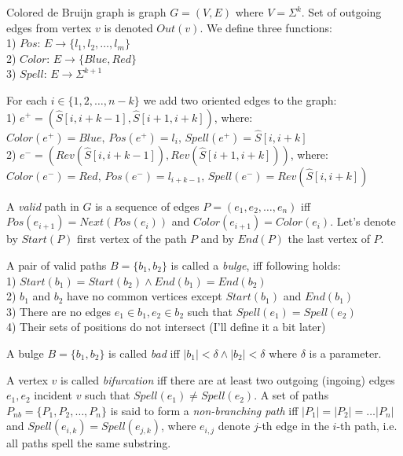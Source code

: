 \documentclass[a4paper,12pt]{scrartcl}
\begin{document}
Colored de Bruijn graph is graph \(G = (V, E) \) where \(V = \Sigma ^ k \). Set of outgoing edges from vertex \(v\) is denoted \(Out(v)\). We define three functions: \\
1) \(Pos : \, E \rightarrow \lbrace l_1, l_2, \ldots , l_m \rbrace \) \\
2) \(Color : \, E \rightarrow \lbrace Blue, Red \rbrace \) \\
3) \(Spell: \, E \rightarrow \Sigma ^ {k + 1} \)

For each \(i \in \lbrace{1, 2, \ldots, n - k} \rbrace \) we add two oriented edges to the graph: \\
1) \(e^+ = (\hat{S}[i, i + k - 1], \hat{S}[i + 1, i + k]) \), where: \\
\(Color(e^+) = Blue, \,  Pos(e^+) = l_i, \, Spell(e^+) = \hat{S}[i, i + k] \) \\
2) \(e^- = (Rev(\hat{S}[i, i + k - 1]), Rev(\hat{S}[i + 1, i + k]))\), where: \\
 \(Color(e^-) = Red, \, Pos(e^-) = l_{i + k - 1}, \, Spell(e^-) = Rev(\hat{S}[i, i + k])\)

A \textit{valid} path in \(G\) is a sequence of edges \(P = (e_{1}, e_{2}, \ldots, e_{n})\) iff \(Pos(e_{i+1})  = Next(Pos(e_{i}))\) and
\(Color(e_{i + 1}) = Color(e_{i})\). Let's denote by \(Start(P)\) first vertex of the path \(P\) and by \(End(P)\) the last vertex of \(P\).

\newpage

A pair of valid paths \(B =\lbrace b_{1}, b_{2} \rbrace \)
is called a \textit{bulge}, iff following holds: \\
1) \(Start(b_{1}) = Start(b_{2}) \wedge End(b_{1}) = End(b_{2}) \) \\
2) \(b_{1}\) and \(b_{2}\) have no common vertices except \(Start(b_{1})\) and \(End(b_{1})\) \\
3) There are no edges \(e_{1} \in b_{1}, e_{2} \in b_{2} \) such that \(Spell(e_{1}) = Spell(e_{2})\) \\
4) Their sets of positions do not intersect (I'll define it a bit later) 

A bulge \(B =\lbrace b_{1}, b_{2} \rbrace \) is called \textit{bad} iff \(|b_1| < \delta \wedge |b_2| < \delta\) where \(\delta\) is a parameter.

A vertex \(v\) is called \textit{bifurcation} iff there are at least two outgoing (ingoing) edges \(e_{1}, e_{2}\) 
incident \(v\) such that \(Spell(e_{1}) \neq Spell(e_{2})\). A set of paths \(P_{nb} = \lbrace P_{1}, P_{2}, \ldots, P_{n} \rbrace\)
is said to form a \textit{non-branching path} iff \(|P_{1}| = |P_{2}| = \ldots |P_{n}| \) and \(Spell(e_{i, k}) = Spell(e_{j, k}) \),
where \(e_{i, j}\) denote \(j\)-th edge in the \(i\)-th path, i.e. all paths spell the same substring.
\end{document}
